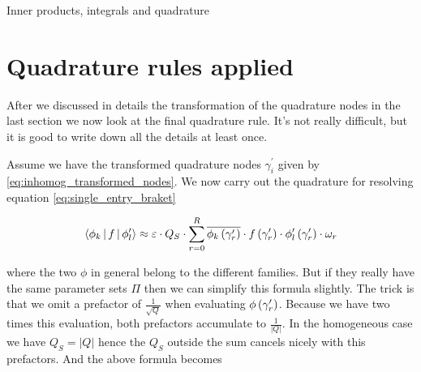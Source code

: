\begin{chapter}{Inner products, integrals and quadrature}
%
%


\section{Quadrature rules applied}

After we discussed in details the transformation of the quadrature nodes in the
last section we now look at the final quadrature rule. It's not really difficult,
but it is good to write down all the details at least once.

Assume we have the transformed quadrature nodes $\gamma_i^\prime$ given by \eqref{eq:inhomog_transformed_nodes}.
We now carry out the quadrature for resolving equation \eqref{eq:single_entry_braket}

\begin{equation}
\begin{split}
  \Braket{\phi_k | f | \phi_l^\prime}
  \approx
  \varepsilon \cdot Q_S \cdot \sum_{r=0}^R \overline{\phi_k\left( \gamma_r^\prime \right)} \cdot f\left( \gamma_r^\prime \right) \cdot \phi_l^\prime\left( \gamma_r^\prime \right) \cdot \omega_r
\end{split}
\end{equation}

where the two $\phi$ in general belong to the different families. But if they really
have the same parameter sets $\Pi$ then we can simplify this formula slightly. The
trick is that we omit a prefactor of $\frac{1}{\sqrt{Q}}$ when evaluating $\phi\left( \gamma_r^\prime \right)$.
Because we have two times this evaluation, both prefactors accumulate to $\frac{1}{|Q|}$.
In the homogeneous case we have $Q_S = |Q|$ hence the $Q_S$ outside the sum
cancels nicely with this prefactors. And the above formula becomes


\end{chapter}
